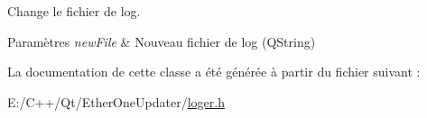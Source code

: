 Change le fichier de log. 


\begin{DoxyParams}{Paramètres}
{\em new\+File} & Nouveau fichier de log (Q\+String) \\
\hline
\end{DoxyParams}


La documentation de cette classe a été générée à partir du fichier suivant \+:\begin{DoxyCompactItemize}
\item 
E\+:/\+C++/\+Qt/\+Ether\+One\+Updater/\hyperlink{loger_8h}{loger.\+h}\end{DoxyCompactItemize}
